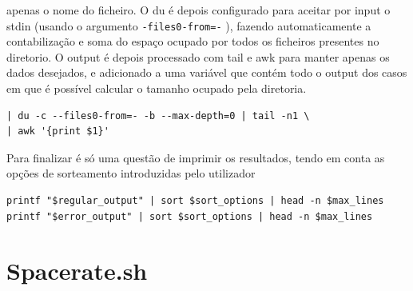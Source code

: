 apenas o nome do ficheiro.
O du é depois configurado para aceitar por input o stdin
(usando o argumento \verb|-files0-from=-| ), fazendo
automaticamente a contabilização e soma do espaço ocupado
por todos os ficheiros presentes no diretorio. O output é
depois processado com tail e awk para manter apenas os dados
desejados, e adicionado a uma variável que contém todo o
output dos casos em que é possível calcular o tamanho
ocupado pela diretoria.
\begin{verbatim}
| du -c --files0-from=- -b --max-depth=0 | tail -n1 \ 
| awk '{print $1}'
\end{verbatim}
Para finalizar é só uma questão de imprimir os resultados,
tendo em conta as opções de sorteamento introduzidas pelo
utilizador
\begin{verbatim}
printf "$regular_output" | sort $sort_options | head -n $max_lines
printf "$error_output" | sort $sort_options | head -n $max_lines
\end{verbatim}

\section{Spacerate.sh}
